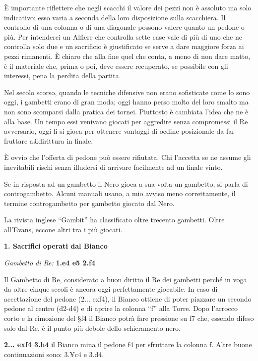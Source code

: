 È importante riflettere che negli scacchi il valore dei pezzi non è
assoluto ma solo indicativo: esso varia a seconda della loro
disposizione sulla scacchiera. Il controllo di una colonna o di una
diagonale possono valere quanto un pedone o più. Per intenderci un
Alfiere che controlla sette case vale di più di uno che ne controlla
solo due e un sacrificio è giustificato se serve a dare maggiore forza
ai pezzi rimanenti. È chiaro che alla fine quel che conta, a meno di non
dare matto, è il materiale che, prima o poi, deve essere recuperato, se
possibile con gli interessi, pena la perdita della partita.

Nel secolo scorso, quando le tecniche difensive non erano sofisticate
come lo sono oggi, i gambetti erano di gran moda; oggi hanno perso molto
del loro smalto ma non sono scomparsi dalla pratica dei tornei.
Piuttosto è cambiata l'idea che ne è alla base. Un tempo essi venivano
giocati per aggredire senza compromessi il Re avversario, oggi li si
gioca per ottenere vantaggi di o¢dine posizionale da far fruttare
a£dirittura in finale.

È ovvio che l'offerta di pedone può essere rifiutata. Chi l'accetta se
ne assume gli inevitabili rischi senza illudersi di arrivare facilmente
ad un finale vinto.

Se in risposta ad un gambetto il Nero gioca a sua volta un gambetto, si
parla di controgambetto. Alcuni manuali usano, a mio avviso meno
correttamente, il termine controgambetto per gambetto giocato dal Nero.

La rivista inglese ``Gambit'' ha classificato oltre trecento gambetti.
Oltre all'Evans, eccone altri tra i più giocati.

\textbf{1. Sacrifici operati dal Bianco}

\emph{Gambetto di Re:} \textbf{1.e4 e5 2.f4}


Il Gambetto di Re, considerato a buon diritto il Re dei gambetti perché
in voga da oltre cinque secoli è ancora oggi perfettamente giocabile. In
caso di accettazione del pedone (2... exf4), il Bianco ottiene di poter
piazzare un secondo pedone al centro (d2-d4) e di aprire la colonna
``f'' alla Torre. Dopo l'arrocco corto e la rimozione del §f4 il Bianco
potrà fare pressione su f7 che, essendo difeso solo dal Re, è il punto
più debole dello schieramento nero.

\textbf{2... exf4 3.h4} il Bianco mina il pedone f4 per sfruttare la
colonna f. Altre buone continuazioni sono: 3.¥c4 e 3.d4.

